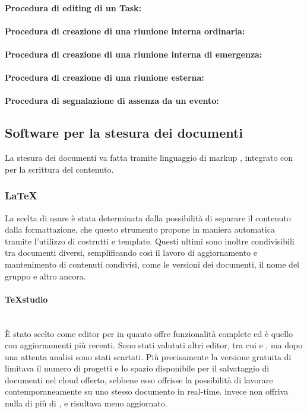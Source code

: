 \paragraph{Procedura di editing di un Task:}

\newpage
\paragraph{Procedura di creazione di una riunione interna ordinaria:}

\newpage
\paragraph{Procedura di creazione di una riunione interna di emergenza:}

\newpage
\paragraph{Procedura di creazione di una riunione esterna:}

\newpage
\paragraph{Procedura di segnalazione di assenza da un evento:}

\subsection{Software per la stesura dei documenti}
La stesura dei documenti va fatta tramite linguaggio di markup \glossario{\LaTeX{}}, integrato con  per la scrittura del contenuto. 

\subsubsection{\LaTeX}
La scelta di usare \glossario{\LaTeX{}} è stata determinata dalla possibilità di separare il contenuto dalla formattazione, che questo strumento propone in maniera automatica tramite l'utilizzo di costrutti e template. Questi ultimi sono inoltre condivisibili tra documenti diversi, semplificando così il lavoro di aggiornamento e mantenimento di contenuti condivisi, come le versioni dei documenti, il nome del gruppo e altro ancora.

\paragraph{TeXstudio}\mbox{}\\
\`{E} stato scelto  come editor per \glossario{\LaTeX{}} in quanto offre funzionalità complete ed è quello con aggiornamenti più recenti. Sono stati valutati altri editor, tra cui  e , ma dopo una attenta analisi sono stati scartati. Più precisamente la versione gratuita di  limitava il numero di progetti e lo spazio disponibile per il salvataggio di documenti nel cloud offerto, sebbene esso offrisse la possibilità di lavorare contemporaneamente su uno stesso documento in real-time.  invece non offriva nulla di più di , e risultava meno aggiornato.

